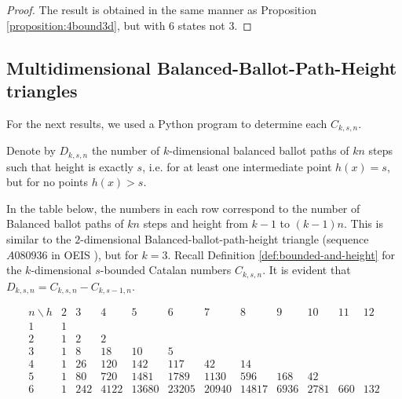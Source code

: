 \documentclass[12pt,notitlepage]{amsart}
\numberwithin{equation}{section}
\theoremstyle{thmstyleone}%
\theoremstyle{thmstyletwo}%
\theoremstyle{thmstylethree}%
\numberwithin{theorem}{section}
\numberwithin{equation}{section}
\begin{document}
\begin{proof}
The result is obtained in the same manner as Proposition \ref{proposition:4bound3d}, but with $6$ states not $3.$
\end{proof}


\subsection{Multidimensional Balanced-Ballot-Path-Height triangles}\label{sec:heighttriangles}

For the next results, we used a Python program to determine each $C_{k,s,n}$. 

Denote by $D_{k,s,n}$ the number of $k$-dimensional balanced ballot paths of $kn$ steps such that height is exactly $s$, i.e. for at least one intermediate point $h(x)=s$, but for no points $h(x) > s$.

In the table below, the numbers in each row correspond to the number of Balanced ballot paths of $kn$ steps and height from $k-1$ to $(k-1)n$. This is similar to the $2$-dimensional Balanced-ballot-path-height triangle (sequence $A080936$ in OEIS \cite{oeis}), but for $k=3$. Recall Definition \ref{def:bounded-and-height} for the $k$-dimensional $s$-bounded Catalan numbers $C_{k,s,n}$. It is evident that $D_{k,s,n} = C_{k,s,n} - C_{k,s-1,n}$.
\vspace{-0.8 em}
\begin{table}[h]
    \centering
  \[
\begin{array}{c|ccccccccccc} n\backslash h & 2 & 3 & 4 & 5 & 6 & 7 & 8 & 9 & 10 & 11 & 12\\
\hline
1 & 1 \\
2 & 1 & 2 & 2 \\
3 & 1 & 8 & 18 & 10 & 5 \\
4 & 1 & 26 & 120 & 142 & 117 & 42 & 14 \\
5 & 1 & 80 & 720 & 1481  & 1789 & 1130 & 596 & 168 & 42 \\
6 & 1 & 242 & 4122 & 13680 & 23205 & 20940 & 14 817 & 6936 & 2781 & 660 & 132
\end{array}
\]
    \caption{The $3$-dimensional Ballanced-Ballot-Path-Height Triangle}
    \label{table:3dtriangle}
\end{table}
\end{document}
